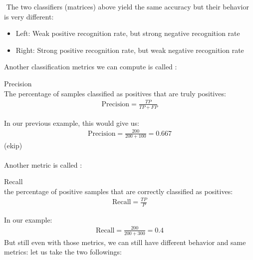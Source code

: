 \begin{parag}{$ $}
    The two classifiers (matrices) above yield the same accuracy but their behavior is very different:
	\begin{itemize}
		\item Left: Weak positive recognition rate, but strong negative recognition rate
		\item Right: Strong positive recognition rate, but weak negative recognition rate
	\end{itemize}
	Another classification metrics we can compute is called :
	\begin{definition}{Precision}
		$ $\\
	The percentage of samples classified as positives that are truly positives:
	\begin{align*} 
		\text{Precision} = \frac{TP}{TP + FP}
	\end{align*}
	\end{definition}
	In our previous example, this would give us:
	\begin{align*} 
		\text{Precision} = \frac{200}{200 + 100} = 0.667
	\end{align*}
	(ekip)\\
	$ $\\
	Another metric is called :
	\begin{definition}{Recall}
		$ $\\
	the percentage of positive samples that are correctly classified as positives:
	\begin{align*} 
		\text{Recall} = \frac{TP}{P}
	\end{align*}
	\end{definition}
	In our example:
	\begin{align*} 
		\text{Recall} = \frac{200}{200 + 300} = 0.4
	\end{align*}
	But still even with those metrics, we can still have different behavior and same metrics:
	let us take the two followings:
\end{parag}
